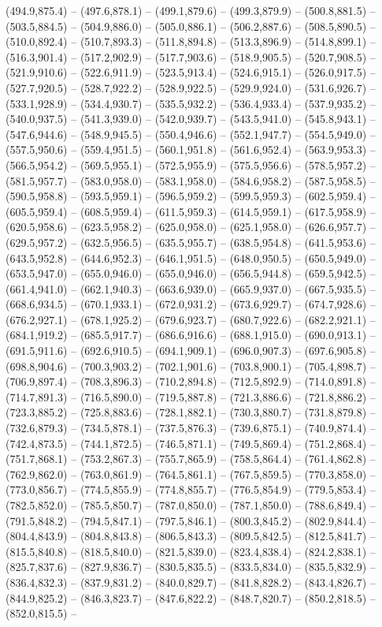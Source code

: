 (494.9,875.4) -- (497.6,878.1) -- (499.1,879.6) -- (499.3,879.9) -- (500.8,881.5) -- (503.5,884.5) -- (504.9,886.0) -- (505.0,886.1) -- (506.2,887.6) -- (508.5,890.5) -- (510.0,892.4) -- (510.7,893.3) -- (511.8,894.8) -- (513.3,896.9) -- (514.8,899.1) -- (516.3,901.4) -- (517.2,902.9) -- (517.7,903.6) -- (518.9,905.5) -- (520.7,908.5) -- (521.9,910.6) -- (522.6,911.9) -- (523.5,913.4) -- (524.6,915.1) -- (526.0,917.5) -- (527.7,920.5) -- (528.7,922.2) -- (528.9,922.5) -- (529.9,924.0) -- (531.6,926.7) -- (533.1,928.9) -- (534.4,930.7) -- (535.5,932.2) -- (536.4,933.4) -- (537.9,935.2) -- (540.0,937.5) -- (541.3,939.0) -- (542.0,939.7) -- (543.5,941.0) -- (545.8,943.1) -- (547.6,944.6) -- (548.9,945.5) -- (550.4,946.6) -- (552.1,947.7) -- (554.5,949.0) -- (557.5,950.6) -- (559.4,951.5) -- (560.1,951.8) -- (561.6,952.4) -- (563.9,953.3) -- (566.5,954.2) -- (569.5,955.1) -- (572.5,955.9) -- (575.5,956.6) -- (578.5,957.2) -- (581.5,957.7) -- (583.0,958.0) -- (583.1,958.0) -- (584.6,958.2) -- (587.5,958.5) -- (590.5,958.8) -- (593.5,959.1) -- (596.5,959.2) -- (599.5,959.3) -- (602.5,959.4) -- (605.5,959.4) -- (608.5,959.4) -- (611.5,959.3) -- (614.5,959.1) -- (617.5,958.9) -- (620.5,958.6) -- (623.5,958.2) -- (625.0,958.0) -- (625.1,958.0) -- (626.6,957.7) -- (629.5,957.2) -- (632.5,956.5) -- (635.5,955.7) -- (638.5,954.8) -- (641.5,953.6) -- (643.5,952.8) -- (644.6,952.3) -- (646.1,951.5) -- (648.0,950.5) -- (650.5,949.0) -- (653.5,947.0) -- (655.0,946.0) -- (655.0,946.0) -- (656.5,944.8) -- (659.5,942.5) -- (661.4,941.0) -- (662.1,940.3) -- (663.6,939.0) -- (665.9,937.0) -- (667.5,935.5) -- (668.6,934.5) -- (670.1,933.1) -- (672.0,931.2) -- (673.6,929.7) -- (674.7,928.6) -- (676.2,927.1) -- (678.1,925.2) -- (679.6,923.7) -- (680.7,922.6) -- (682.2,921.1) -- (684.1,919.2) -- (685.5,917.7) -- (686.6,916.6) -- (688.1,915.0) -- (690.0,913.1) -- (691.5,911.6) -- (692.6,910.5) -- (694.1,909.1) -- (696.0,907.3) -- (697.6,905.8) -- (698.8,904.6) -- (700.3,903.2) -- (702.1,901.6) -- (703.8,900.1) -- (705.4,898.7) -- (706.9,897.4) -- (708.3,896.3) -- (710.2,894.8) -- (712.5,892.9) -- (714.0,891.8) -- (714.7,891.3) -- (716.5,890.0) -- (719.5,887.8) -- (721.3,886.6) -- (721.8,886.2) -- (723.3,885.2) -- (725.8,883.6) -- (728.1,882.1) -- (730.3,880.7) -- (731.8,879.8) -- (732.6,879.3) -- (734.5,878.1) -- (737.5,876.3) -- (739.6,875.1) -- (740.9,874.4) -- (742.4,873.5) -- (744.1,872.5) -- (746.5,871.1) -- (749.5,869.4) -- (751.2,868.4) -- (751.7,868.1) -- (753.2,867.3) -- (755.7,865.9) -- (758.5,864.4) -- (761.4,862.8) -- (762.9,862.0) -- (763.0,861.9) -- (764.5,861.1) -- (767.5,859.5) -- (770.3,858.0) -- (773.0,856.7) -- (774.5,855.9) -- (774.8,855.7) -- (776.5,854.9) -- (779.5,853.4) -- (782.5,852.0) -- (785.5,850.7) -- (787.0,850.0) -- (787.1,850.0) -- (788.6,849.4) -- (791.5,848.2) -- (794.5,847.1) -- (797.5,846.1) -- (800.3,845.2) -- (802.9,844.4) -- (804.4,843.9) -- (804.8,843.8) -- (806.5,843.3) -- (809.5,842.5) -- (812.5,841.7) -- (815.5,840.8) -- (818.5,840.0) -- (821.5,839.0) -- (823.4,838.4) -- (824.2,838.1) -- (825.7,837.6) -- (827.9,836.7) -- (830.5,835.5) -- (833.5,834.0) -- (835.5,832.9) -- (836.4,832.3) -- (837.9,831.2) -- (840.0,829.7) -- (841.8,828.2) -- (843.4,826.7) -- (844.9,825.2) -- (846.3,823.7) -- (847.6,822.2) -- (848.7,820.7) -- (850.2,818.5) -- (852.0,815.5) -- 